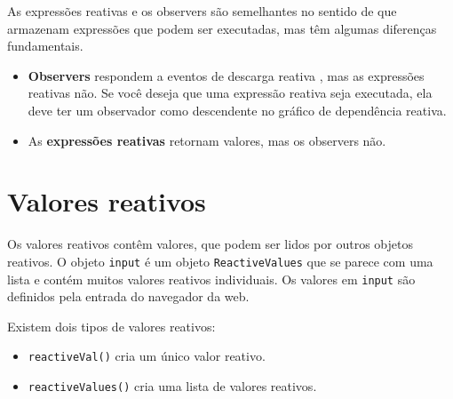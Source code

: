 \documentclass[
]{book}
\newenvironment{Shaded}{\begin{snugshade}}{\end{snugshade}}
\newcommand{\AttributeTok}[1]{\textcolor[rgb]{0.77,0.63,0.00}{#1}}
\newcommand{\CommentTok}[1]{\textcolor[rgb]{0.56,0.35,0.01}{\textit{#1}}}
\newcommand{\DecValTok}[1]{\textcolor[rgb]{0.00,0.00,0.81}{#1}}
\newcommand{\FunctionTok}[1]{\textcolor[rgb]{0.00,0.00,0.00}{#1}}
\newcommand{\NormalTok}[1]{#1}
\newcommand{\OtherTok}[1]{\textcolor[rgb]{0.56,0.35,0.01}{#1}}
\newcommand{\SpecialCharTok}[1]{\textcolor[rgb]{0.00,0.00,0.00}{#1}}
\begin{document}
As expressões reativas e os observers são semelhantes no sentido de que armazenam expressões que podem ser executadas, mas têm algumas diferenças fundamentais.

\begin{itemize}
\item
  \textbf{Observers} respondem a eventos de descarga reativa , mas as expressões reativas não. Se você deseja que uma expressão reativa seja executada, ela deve ter um observador como descendente no gráfico de dependência reativa.
\item
  As \textbf{expressões reativas} retornam valores, mas os observers não.
\end{itemize}

\hypertarget{valores-reativos}{%
\section{\texorpdfstring{\textbf{Valores reativos}}{Valores reativos}}\label{valores-reativos}}

Os valores reativos contêm valores, que podem ser lidos por outros objetos reativos. O objeto \texttt{input} é um objeto \texttt{ReactiveValues} que se parece com uma lista e contém muitos valores reativos individuais. Os valores em \texttt{input} são definidos pela entrada do navegador da web.

Existem dois tipos de valores reativos:

\begin{itemize}
\item
  \texttt{reactiveVal()} cria um único valor reativo.
\item
  \texttt{reactiveValues()} cria uma lista de valores reativos.
\end{itemize}

\begin{Shaded}
\end{Shaded}
\end{document}
